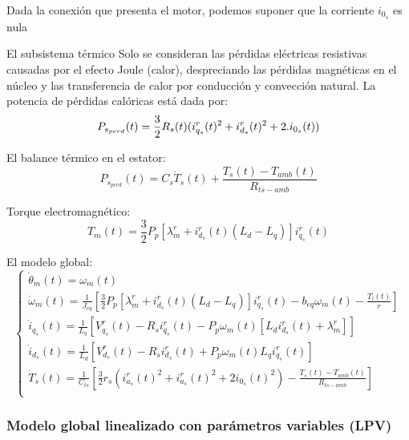 \documentclass{article}
\begin{document}
Dada la conexión que presenta el motor, podemos suponer que la corriente $i_{0_{s}}$ es nula

El subsistema térmico
Solo se consideran las pérdidas eléctricas resistivas causadas por el efecto Joule (calor),
 despreciando las pérdidas magnéticas en el núcleo y las transferencia de calor por conducción 
y convección natural. La potencia de pérdidas calóricas está dada por:\\
\begin{equation}
    P_{s_{perd}}(t) =  \frac{3}{2}R_{s}(t)(i_{q_{s}}^r(t)^2+i_{d_{s}}^r(t)^2+2.i_{0_{s}}(t))\\
\end{equation}
\par El balance térmico en el estator:
\begin{equation}
    P_{s_{perd}}(t) = C_{s}\dot{T}_{s}(t) + \frac{T_{s}(t)-T_{amb}(t)}{R_{ts-amb}}
\end{equation}

Torque electromagnético:
\begin{equation}
    T_{m}(t) = \frac{3}{2}P_{p}[\lambda_{m}^r+i_{d_{s}}^r(t)(L_{d}-L_{q})]i_{q_{s}}^r(t)
\end{equation}

El modelo global:
\begin{equation}
    \begin{cases}
        \dot{\theta}_{m}(t) = \omega_{m}(t)\\
        \dot{\omega}_{m}(t) = \frac{1}{J_{eq}}[\frac{3}{2}P_{p}[\lambda_{m}^r+i_{d_{s}}^r(t)(L_{d}-L_{q})]i_{q_{s}}^r(t) - b_{eq}\omega_{m}(t) - \frac{T_{l}(t)}{r}]\\
        \dot{i}_{q_{s}}(t) = \frac{1}{L_{q}}[V_{q_{s}}^r(t) - R_{s}i_{q_{s}}^r(t) - P_{p}\omega_{m}(t)[L_{d}i_{d_{s}}^r(t)+\lambda_{m}^r]]  \\
        \dot{i}_{d_{s}}(t) = \frac{1}{L_{d}}[V_{d_{s}}^r(t) - R_{s}i_{d_{s}}^r(t) + P_{p}\omega_{m}(t)L_{q}i_{q_{s}}^r(t)]  \\
        \dot{T}_{s}(t) = \frac{1}{C_{ts}}[\frac{3}{2}r_{s}({i_{a_{s}}^r(t)}^2+{i_{a_{s}}^r(t)}^2+2i_{0_{s}}(t)^2)-\frac{T_{s}(t)-T_{amb}(t)}{R_{ts-amb}}]\\
    \end{cases}
\end{equation}



\subsubsection*{Modelo global linealizado con parámetros variables (LPV)}
\end{document}
